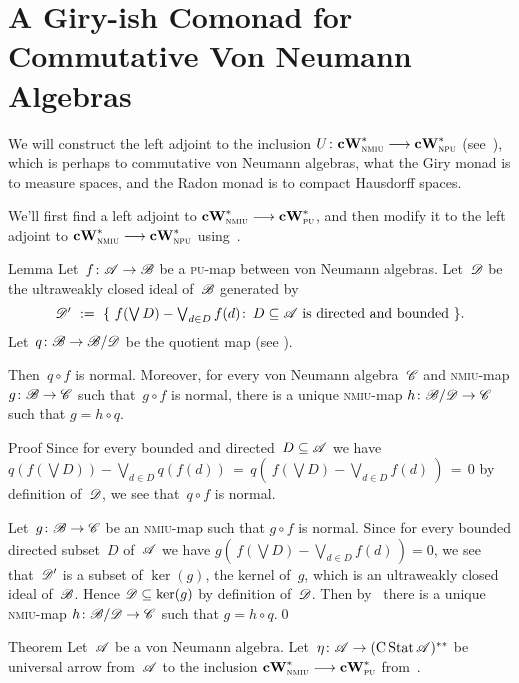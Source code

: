 \documentclass[a]{subfiles}
\begin{document}
\chapter{A Giry-ish Comonad for Commutative Von Neumann Algebras}


\begin{parsec}%
\begin{point}%
We will construct the left adjoint
to the inclusion $U\colon \mathbf{cW}^*_{\text{\textsc{nmiu}}}\longrightarrow \mathbf{cW}^*_{\text{\textsc{npu}}}$
(see~),
which 
is perhaps to commutative von Neumann algebras,
what the Giry monad is to  measure spaces,
and the Radon monad is to compact Hausdorff spaces.

We'll first find a left adjoint to $\mathbf{cW}^*_{\text{\textsc{nmiu}}}\longrightarrow \mathbf{cW}^*_{\text{\textsc{pu}}}$,
and then modify it
to the left adjoint to $\mathbf{cW}^*_{\text{\textsc{nmiu}}}\longrightarrow \mathbf{cW}^*_{\text{\textsc{npu}}}$
using~.
\end{point}
\begin{point}{Lemma}%
Let~$f\colon \mathscr{A}\to\mathscr{B}$
be a \textsc{pu}-map between
von Neumann algebras.
Let~$\mathscr{D}$ be the ultraweakly closed ideal of~$\mathscr{B}$
generated by
\begin{equation*}
\textstyle
\mathscr{D}' \ :=\ \{\ f(\bigvee D)-\bigvee_{d\in D}f(d)\colon \, 
D\subseteq \mathscr{A}\text{ is directed and bounded}\ \}.
\end{equation*}
Let~$q\colon \mathscr{B}\to \mathscr{B}/\mathscr{D}$ be the quotient
map (see ).

Then~$q\circ f$ is normal.
Moreover,
for every von Neumann algebra~$\mathscr{C}$
and \textsc{nmiu}-map $g\colon \mathscr{B}\to \mathscr{C}$
such that~$g\circ f$ is normal,
there is a unique \textsc{nmiu}-map $h\colon \mathscr{B}/\mathscr{D}\to \mathscr{C}$
such that $g=h \circ q$.
\begin{point}{Proof}%
Since for every bounded and directed~$D\subseteq \mathscr{A}$
we have
$q(f(\bigvee D)) - \bigvee_{d\in D}q(f(d))
\,=\, q(\ f(\bigvee D)-\bigvee_{d\in D}f(d)\ ) \,=\, 0$
by definition of~$\mathscr{D}$,
we see that~$q\circ f$ is normal.
\end{point}
\begin{point}%
Let~$g\colon \mathscr{B}\to \mathscr{C}$ be an \textsc{nmiu}-map
such that $g\circ f$ is normal.
Since for every bounded directed subset~$D$ of~$\mathscr{A}$
we have $g(\,f(\bigvee D)-\bigvee_{d\in D}f(d)\,)=0$,
we see that~$\mathscr{D}'$ is a subset of $\ker(g)$, the kernel of~$g$,
which is an ultraweakly closed ideal of~$\mathscr{B}$.
Hence $\mathscr{D}\subseteq \ker(g)$ by definition of~$\mathscr{D}$.
Then by~
there is a unique \textsc{nmiu}-map $h\colon \mathscr{B}/\mathscr{D}\to \mathscr{C}$
such that $g=h\circ q$.\qed
\end{point}
\end{point}
\begin{point}[cw-giry]{Theorem}%
Let~$\mathscr{A}$ be a von Neumann algebra.
Let~$\eta\colon\mathscr{A}\to (\operatorname{C}\operatorname{Stat}\mathscr{A})^{**}$
be universal arrow from~$\mathscr{A}$ to
the inclusion $\mathbf{cW}^*_{\text{\textsc{nmiu}}}\longrightarrow \mathbf{cW}^*_{\text{\textsc{pu}}}$
from~.


\end{point}
\end{parsec}
\end{document}
